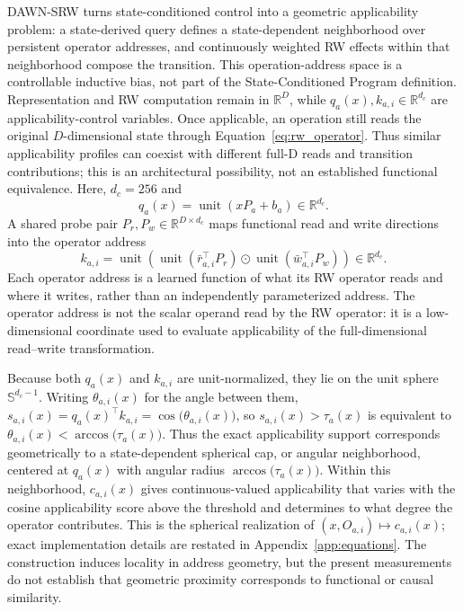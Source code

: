 \documentclass{article}
\newcommand{\R}{\mathbb{R}}
\newcommand{\od}{\mathbin{\odot}}
\newcommand{\DAWN}{DAWN-SRW}
\begin{document}
\DAWN{} turns state-conditioned control into a geometric applicability problem: a
state-derived query defines a state-dependent neighborhood over persistent
operator addresses, and continuously weighted RW effects within that neighborhood
compose the transition. This operation-address space is a controllable inductive
bias, not part of the State-Conditioned Program definition. Representation and
RW computation remain in \(\R^D\), while \(q_a(x),k_{a,i}\in\R^{d_c}\) are
applicability-control variables. Once applicable, an operation still reads the
original \(D\)-dimensional state through Equation~\ref{eq:rw_operator}. Thus
similar applicability profiles can coexist with different full-D reads and
transition contributions; this is an architectural possibility, not an
established functional equivalence. Here, \(d_c=256\) and
\begin{equation}
q_a(x)=\operatorname{unit}(xP_a+b_a)\in\R^{d_c}.
\label{eq:query}
\end{equation}
A shared probe pair \(P_r,P_w\in\R^{D\times d_c}\) maps functional read and
write directions into the operator address
\begin{equation}
k_{a,i}=\operatorname{unit}\!\left(
\operatorname{unit}(\bar r_{a,i}^{\top}P_r)\od
\operatorname{unit}(\bar w_{a,i}^{\top}P_w)\right)\in\R^{d_c}.
\label{eq:rw_address}
\end{equation}
Each operator address is a learned function of what its RW operator reads and
where it writes, rather than an independently parameterized address. The
operator address is not the scalar operand read by the RW operator: it is a
low-dimensional coordinate used to evaluate applicability of the
full-dimensional read--write transformation.

Because both \(q_a(x)\) and \(k_{a,i}\) are unit-normalized, they lie on the
unit sphere \(\mathbb{S}^{d_c-1}\). Writing \(\theta_{a,i}(x)\) for the angle
between them, \(s_{a,i}(x)=q_a(x)^\top k_{a,i}=\cos\!\big(\theta_{a,i}(x)\big)\),
so \(s_{a,i}(x)>\tau_a(x)\) is equivalent to
\(\theta_{a,i}(x)<\arccos\!\big(\tau_a(x)\big)\). Thus the exact applicability
support corresponds geometrically to a state-dependent spherical cap, or
angular neighborhood, centered at \(q_a(x)\) with angular radius
\(\arccos\!\big(\tau_a(x)\big)\). Within this neighborhood,
\(c_{a,i}(x)\) gives continuous-valued applicability that varies with the cosine
applicability score above the threshold and determines to what degree the
operator contributes. This is the spherical realization of
\((x,O_{a,i})\mapsto c_{a,i}(x)\); exact implementation details are restated in
Appendix~\ref{app:equations}. The construction induces locality in address
geometry, but the present measurements do not establish that geometric
proximity corresponds to functional or causal similarity.
\end{document}
